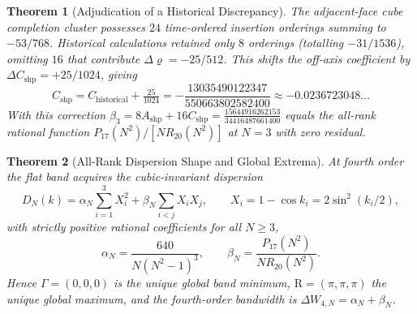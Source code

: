\documentclass[11pt,a4paper]{article}
\newtheorem{theorem}{Theorem}[section]
\theoremstyle{definition}
\newcommand{\Ashp}{A_{\mathrm{shp}}}
\newcommand{\Cshp}{C_{\mathrm{shp}}}
\begin{document}
\begin{theorem}[Adjudication of a Historical Discrepancy]\label{thm:intro_adjudication}
The adjacent-face cube completion cluster possesses $24$ time-ordered insertion orderings summing to $-53/768$. Historical calculations retained only $8$ orderings (totalling $-31/1536$), omitting $16$ that contribute $\Delta\varrho = -25/512$. This shifts the off-axis coefficient by $\Delta\Cshp = +25/1024$, giving
\begin{equation}\label{eq:intro_cshp}
  \Cshp = C_{\mathrm{historical}} + \tfrac{25}{1024} = -\frac{13035490122347}{550663802582400} \approx -0.0236723048\ldots
\end{equation}
With this correction $\beta_3 = 8\Ashp + 16\Cshp = \frac{15644916262153}{34416487661400}$ equals the all-rank rational function $P_{17}(N^2)/[N R_{20}(N^2)]$ at $N=3$ with zero residual.
\end{theorem}

\begin{theorem}[All-Rank Dispersion Shape and Global Extrema]\label{thm:intro_dispersion}
At fourth order the flat band acquires the cubic-invariant dispersion
\begin{equation}\label{eq:intro_DN}
  D_N(k) = \alpha_N \sum_{i=1}^3 X_i^2 + \beta_N \sum_{i<j} X_i X_j, \qquad X_i = 1-\cos k_i = 2\sin^2(k_i/2),
\end{equation}
with strictly positive rational coefficients for all $N \ge 3$,
\begin{equation}
  \alpha_N = \frac{640}{N(N^2-1)^3}, \qquad \beta_N = \frac{P_{17}(N^2)}{N R_{20}(N^2)}.
\end{equation}
Hence $\Gamma = (0,0,0)$ is the unique global band minimum, $\mathrm{R} = (\pi,\pi,\pi)$ the unique global maximum, and the fourth-order bandwidth is $\Delta W_{4,N} = \alpha_N + \beta_N$.
\end{theorem}
\end{document}
